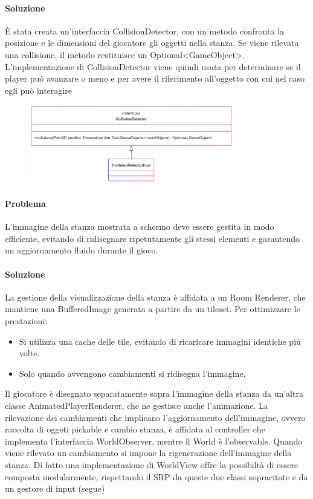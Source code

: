 \documentclass[a4paper,12pt]{report}
\begin{document}
\paragraph{Soluzione} %
È stata creata un'interfaccia CollisionDetector, con un metodo confronta la posizione e le dimensioni del giocatore gli oggetti nella stanza. Se viene rilevata una collisione, il metodo restituisce un Optional<GameObject>.
L'implementazione di CollisionDetector viene quindi usata per determinare se il player può avanzare o meno e per avere il riferimento all'oggetto con cui nel caso egli può interagire
\begin{figure} 
    \centering
    \includegraphics[width=0.8\textwidth]{img/CD.png}
    \label{img:CD}
\end{figure}

\paragraph{Problema} %
L’immagine della stanza mostrata a schermo deve essere gestita in modo efficiente, evitando di ridisegnare ripetutamente gli stessi elementi e garantendo un aggiornamento fluido durante il gioco.
\paragraph{Soluzione} %
La gestione della visualizzazione della stanza è affidata a un Room Renderer, che mantiene una BufferedImage generata a partire da un tileset. Per ottimizzare le prestazioni:
\begin{itemize}
    \item Si utilizza una cache delle tile, evitando di ricaricare immagini identiche più volte.
    \item Solo quando avvengono cambiamenti si ridisegna l’immagine.
\end{itemize}
Il giocatore è disegnato separatamente sopra l’immagine della stanza da un’altra classe AnimatedPlayerRenderer, che ne gestisce anche l’animazione. 
La rilevazione dei cambiamenti che implicano l’aggiornamento dell’immagine, ovvero raccolta di oggeti pickable e cambio stanza, è affidata al controller che implementa l’interfaccia WorldObserver, mentre il World è l'observable.
Quando viene rilevato un cambiamento si impone la rigenerazione dell'immagine della stanza.
Di fatto una implementazione di WorldView offre la possibiltà di essere composta modularmente, rispettando il SRP da queste due classi sopracitate e da un gestore di input (segue)
\end{document}
